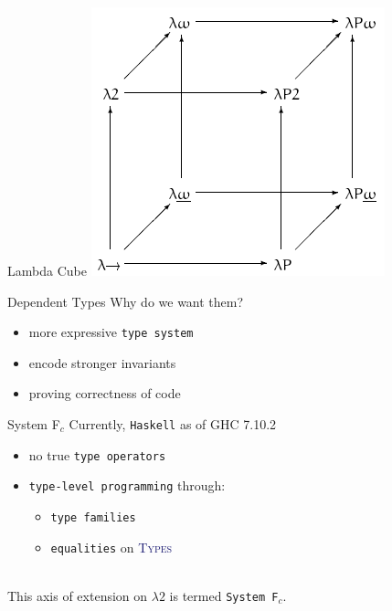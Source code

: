 \documentclass[xcolor={usenames,dvipsnames}]{beamer}
\newcommand{\htycon}[1]{\textcolor{MidnightBlue}{\textsc{#1}}}
\begin{document}
\begin{frame}[fragile]{Lambda Cube}
  \includegraphics[scale=0.6]{Lambda_cube.png}
\end{frame}

\begin{frame}[fragile]{Dependent Types}
  Why do we want them?
  \begin{itemize}
    \item more expressive \texttt{type system}
    \item encode stronger invariants
    \item proving correctness of code
  \end{itemize}
\end{frame}

\begin{frame}[fragile]{System F$_c$}
  Currently, \texttt{Haskell} as of GHC 7.10.2
  \begin{itemize}
    \item no true \texttt{type operators}
    \pause
    \item \texttt{type-level programming} through:
      \begin{itemize}
        \item \texttt{type families}
        \pause
        \item \texttt{equalities} on \htycon{Types}
      \end{itemize}
  \end{itemize}

  \ \\
  \pause
  This axis of extension on $\lambda2$ is termed \texttt{System F$_c$}.
\end{frame}
\end{document}
